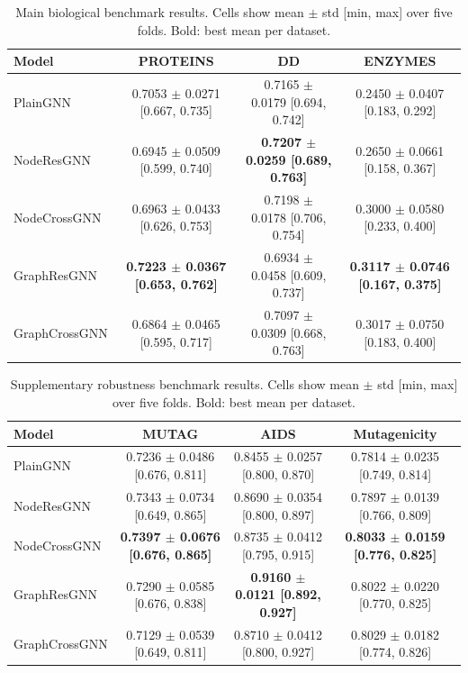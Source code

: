 \begin{table}[t]
\centering
\footnotesize
\setlength{\tabcolsep}{4pt}
\caption{Main biological benchmark results. Cells show mean $\pm$ std [min, max] over five folds. Bold: best mean per dataset.}
\label{tab:all_results_1}
\begin{tabular}{lccc}
\toprule
Model & PROTEINS & DD & ENZYMES \\
\midrule
PlainGNN & 0.7053 $\pm$ 0.0271 [0.667, 0.735] & 0.7165 $\pm$ 0.0179 [0.694, 0.742] & 0.2450 $\pm$ 0.0407 [0.183, 0.292] \\
NodeResGNN & 0.6945 $\pm$ 0.0509 [0.599, 0.740] & \textbf{0.7207 $\pm$ 0.0259 [0.689, 0.763]} & 0.2650 $\pm$ 0.0661 [0.158, 0.367] \\
NodeCrossGNN & 0.6963 $\pm$ 0.0433 [0.626, 0.753] & 0.7198 $\pm$ 0.0178 [0.706, 0.754] & 0.3000 $\pm$ 0.0580 [0.233, 0.400] \\
GraphResGNN & \textbf{0.7223 $\pm$ 0.0367 [0.653, 0.762]} & 0.6934 $\pm$ 0.0458 [0.609, 0.737] & \textbf{0.3117 $\pm$ 0.0746 [0.167, 0.375]} \\
GraphCrossGNN & 0.6864 $\pm$ 0.0465 [0.595, 0.717] & 0.7097 $\pm$ 0.0309 [0.668, 0.763] & 0.3017 $\pm$ 0.0750 [0.183, 0.400] \\
\bottomrule
\end{tabular}
\end{table}

\begin{table}[t]
\centering
\footnotesize
\setlength{\tabcolsep}{4pt}
\caption{Supplementary robustness benchmark results. Cells show mean $\pm$ std [min, max] over five folds. Bold: best mean per dataset.}
\label{tab:all_results_2}
\begin{tabular}{lccc}
\toprule
Model & MUTAG & AIDS & Mutagenicity \\
\midrule
PlainGNN & 0.7236 $\pm$ 0.0486 [0.676, 0.811] & 0.8455 $\pm$ 0.0257 [0.800, 0.870] & 0.7814 $\pm$ 0.0235 [0.749, 0.814] \\
NodeResGNN & 0.7343 $\pm$ 0.0734 [0.649, 0.865] & 0.8690 $\pm$ 0.0354 [0.800, 0.897] & 0.7897 $\pm$ 0.0139 [0.766, 0.809] \\
NodeCrossGNN & \textbf{0.7397 $\pm$ 0.0676 [0.676, 0.865]} & 0.8735 $\pm$ 0.0412 [0.795, 0.915] & \textbf{0.8033 $\pm$ 0.0159 [0.776, 0.825]} \\
GraphResGNN & 0.7290 $\pm$ 0.0585 [0.676, 0.838] & \textbf{0.9160 $\pm$ 0.0121 [0.892, 0.927]} & 0.8022 $\pm$ 0.0220 [0.770, 0.825] \\
GraphCrossGNN & 0.7129 $\pm$ 0.0539 [0.649, 0.811] & 0.8710 $\pm$ 0.0412 [0.800, 0.927] & 0.8029 $\pm$ 0.0182 [0.774, 0.826] \\
\bottomrule
\end{tabular}
\end{table}

